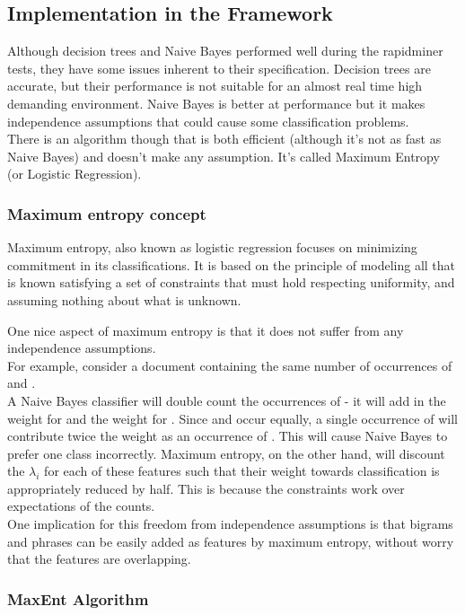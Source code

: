 \subsection{Implementation in the Framework}
Although decision trees and Naive Bayes performed well during the rapidminer tests, they have some issues inherent to their specification. Decision trees are accurate, but their performance is 
not suitable for an almost real time high demanding environment. Naive Bayes is better at performance but it makes independence assumptions that could cause some classification problems.\\
There is an algorithm though that is both efficient (although it's not as fast as Naive Bayes) and doesn't make any assumption. It's called Maximum Entropy (or Logistic Regression).

\subsubsection{Maximum entropy concept}
Maximum entropy, also known as logistic regression focuses on minimizing commitment in its classifications. It is based on the principle of modeling all that is known satisfying a set of constraints
that must hold respecting uniformity, and assuming nothing about what is unknown.

One nice aspect of maximum entropy is that it does not suffer from any independence assumptions.\\
For example, consider a document containing the same number of occurrences of  and .\\
A Naive Bayes classifier will double count the occurrences of  
- it will add in the weight for  and the weight for . Since  and
 occur equally, a single occurrence of  will contribute twice the weight as an occurrence of . This will cause Naive Bayes to prefer one class 
incorrectly.
Maximum entropy, on the other hand, will discount the $\lambda_i$ for each of these features such that their weight towards classification is appropriately reduced by half.
This is because the constraints work over expectations of the counts. \\
One implication for this freedom from independence assumptions is that bigrams and phrases can be easily added as features by maximum entropy, without worry that the features are overlapping.


\subsubsection{MaxEnt Algorithm}


